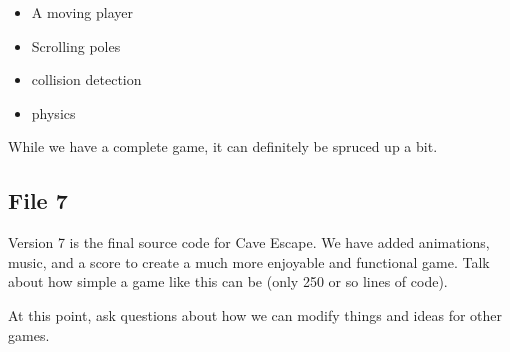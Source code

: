 \documentclass[12pt]{article}
\begin{document}
\begin{itemize}
\item A moving player
\item Scrolling poles
\item collision detection
\item physics
\end{itemize}

While we have a complete game, it can definitely be spruced up a bit.

\subsection*{File 7}
Version 7 is the final source code for Cave Escape. We have added animations, music, and a score to create a much more enjoyable and functional game.
Talk about how simple a game like this can be (only 250 or so lines of code).

At this point, ask questions about how we can modify things and ideas for other games.
\end{document}
